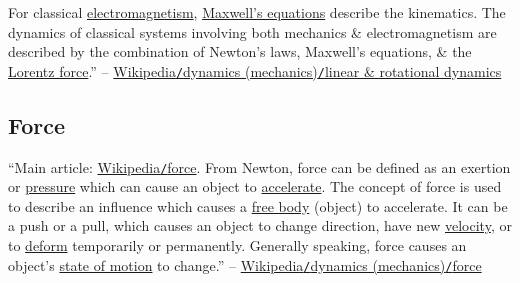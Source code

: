 \documentclass{article}
\begin{document}
For classical \href{https://en.wikipedia.org/wiki/Electromagnetism}{electromagnetism}, \href{https://en.wikipedia.org/wiki/Maxwell%27s_equations}{Maxwell's equations} describe the kinematics. The dynamics of classical systems involving both mechanics \& electromagnetism are described by the combination of Newton's laws, Maxwell's equations, \& the \href{https://en.wikipedia.org/wiki/Lorentz_force}{Lorentz force}.'' -- \href{https://en.wikipedia.org/wiki/Dynamics_(mechanics)#Linear_and_rotational_dynamics}{Wikipedia\texttt{/}dynamics (mechanics)\texttt{/}linear \& rotational dynamics}

\subsection{Force}
``Main article: \href{https://en.wikipedia.org/wiki/Force}{Wikipedia\texttt{/}force}. From Newton, force can be defined as an exertion or \href{https://en.wikipedia.org/wiki/Pressure}{pressure} which can cause an object to \href{https://en.wikipedia.org/wiki/Accelerate}{accelerate}. The concept of force is used to describe an influence which causes a \href{https://en.wikipedia.org/wiki/Free_body}{free body} (object) to accelerate. It can be a push or a pull, which causes an object to change direction, have new \href{https://en.wikipedia.org/wiki/Velocity}{velocity}, or to \href{https://en.wikipedia.org/wiki/Deformation_(mechanics)}{deform} temporarily or permanently. Generally speaking, force causes an object's \href{https://en.wikipedia.org/wiki/Motion_(physics)}{state of motion} to change.'' -- \href{https://en.wikipedia.org/wiki/Dynamics_(mechanics)#Force}{Wikipedia\texttt{/}dynamics (mechanics)\texttt{/}force}
\end{document}
